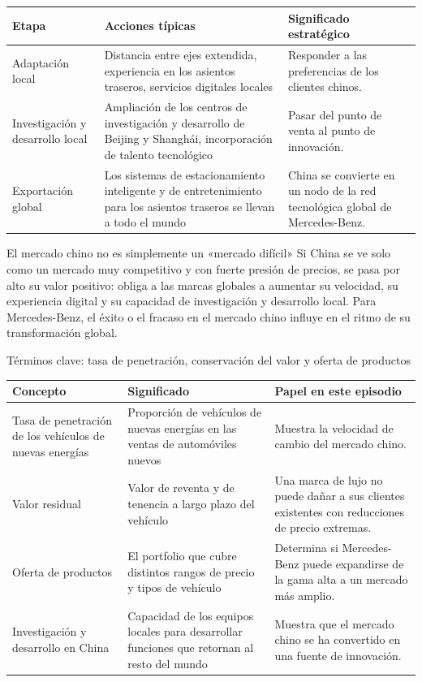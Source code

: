 \documentclass[a4paper]{article}
\begin{document}
\noindent\begin{tabularx}{\textwidth}{p{}p{}X}
\toprule
Etapa & Acciones típicas & Significado estratégico \\
\midrule
Adaptación local & Distancia entre ejes extendida, experiencia en los asientos traseros, servicios digitales locales & Responder a las preferencias de los clientes chinos. \\
Investigación y desarrollo local & Ampliación de los centros de investigación y desarrollo de Beijing y Shanghái, incorporación de talento tecnológico & Pasar del punto de venta al punto de innovación. \\
Exportación global & Los sistemas de estacionamiento inteligente y de entretenimiento para los asientos traseros se llevan a todo el mundo & China se convierte en un nodo de la red tecnológica global de Mercedes-Benz. \\
\bottomrule
\end{tabularx}

\begin{importantbox}{El mercado chino no es simplemente un «mercado difícil»}
Si China se ve solo como un mercado muy competitivo y con fuerte presión de precios, se pasa por alto su valor positivo: obliga a las marcas globales a aumentar su velocidad, su experiencia digital y su capacidad de investigación y desarrollo local. Para Mercedes-Benz, el éxito o el fracaso en el mercado chino influye en el ritmo de su transformación global.
\end{importantbox}

\begin{knowledgebox}{Términos clave: tasa de penetración, conservación del valor y oferta de productos}
\noindent\begin{tabularx}{\textwidth}{p{}p{}X}
\toprule
Concepto & Significado & Papel en este episodio \\
\midrule
Tasa de penetración de los vehículos de nuevas energías & Proporción de vehículos de nuevas energías en las ventas de automóviles nuevos & Muestra la velocidad de cambio del mercado chino. \\
Valor residual & Valor de reventa y de tenencia a largo plazo del vehículo & Una marca de lujo no puede dañar a sus clientes existentes con reducciones de precio extremas. \\
Oferta de productos & El portfolio que cubre distintos rangos de precio y tipos de vehículo & Determina si Mercedes-Benz puede expandirse de la gama alta a un mercado más amplio. \\
Investigación y desarrollo en China & Capacidad de los equipos locales para desarrollar funciones que retornan al resto del mundo & Muestra que el mercado chino se ha convertido en una fuente de innovación. \\
\bottomrule
\end{tabularx}
\end{knowledgebox}
\end{document}
